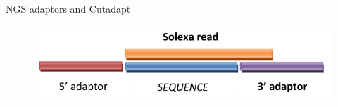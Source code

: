 \begin{frame}{NGS adaptors and Cutadapt}

\begin{figure}[htbp]
\centering
\includegraphics[width=\textwidth,height=0.8\textheight,keepaspectratio]{images/adaptors.png}
\end{figure}

\end{frame}
